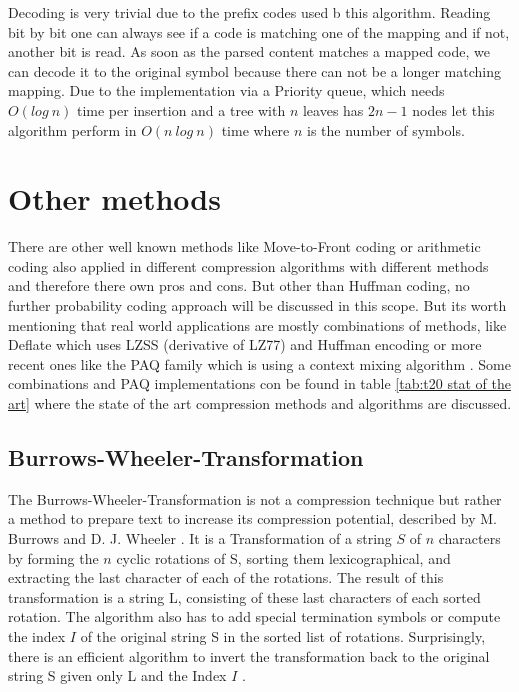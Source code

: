 \par{
Decoding is very trivial due to the prefix codes used b this algorithm. Reading bit by bit one can always see if a code is matching one of the mapping and if not, another bit is read. As soon as the parsed content matches a mapped code, we can decode it to the original symbol because there can not be a longer matching mapping. Due to the implementation via a Priority queue, which needs $O(log \: n)$ time per insertion and a tree with $n$ leaves has $2n-1$ nodes let this algorithm perform in $O(n \: log \: n)$ time where $n$ is the number of symbols.
}

\section{Other methods}
\label{ch:Principles of compression:sec:Other}
\par{
There are other well known methods like Move-to-Front coding or arithmetic coding also applied in different compression algorithms with different methods and therefore there own pros and cons. But other than Huffman coding, no further probability coding approach will be discussed in this scope. But its worth mentioning that real world applications are mostly combinations of methods, like Deflate\cite{deutsch1996rfc1951} which uses LZSS\cite{10.1145/322344.322346} (derivative of LZ77) and Huffman encoding or more recent ones like the PAQ family which is using a context mixing algorithm \cite{mahoney2009data}. Some combinations and PAQ implementations con be found in table \ref{tab:t20 stat of the art} where the state of the art compression methods and algorithms are discussed.
}

\subsection{Burrows-Wheeler-Transformation}
\label{ch:Principles of compression:sec:Other:subSec:bwt}

\par{
The Burrows-Wheeler-Transformation is not a compression technique but rather a method to prepare text to increase its compression potential, described by M. Burrows and D. J. Wheeler \cite{Burrows94}. It is a Transformation of a string $S$ of $n$ characters by forming the $n$ cyclic rotations of S, sorting them lexicographical, and extracting the last character of each of the rotations. The result of this transformation is a string L, consisting of these last characters of each sorted rotation. The algorithm also has to add special termination symbols or compute the index $I$ of the original string S in the sorted list of rotations. Surprisingly, there is an efficient algorithm to invert the transformation back to the original string S given only L and the Index $I$ \cite{Burrows-linear-time}.
}

